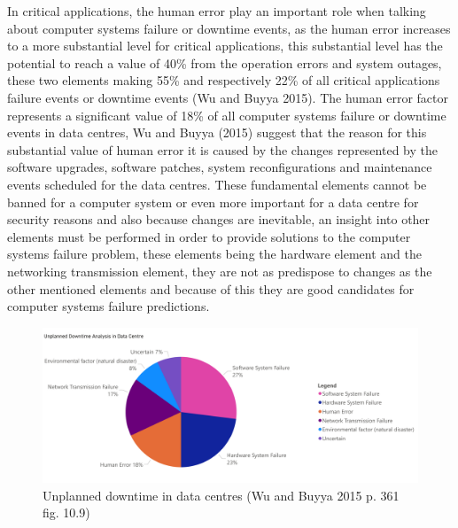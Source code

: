 In critical applications, the human error play an important role when talking about computer systems failure or
downtime events, as the human error increases to a more substantial level for critical applications, this
substantial level has the potential to reach a value of 40\% from the operation errors and system outages,
these two elements making 55\% and respectively 22\% of all critical applications failure events or downtime
events (Wu and Buyya 2015). The human error factor represents a significant value of 18\% of all computer systems
failure or downtime events in data centres, Wu and Buyya (2015) suggest that the reason for this substantial value
of human error it is caused by the changes represented by the software upgrades, software patches, system
reconfigurations and maintenance events scheduled for the data centres. These fundamental elements cannot be
banned for a computer system or even more important for a data centre for security reasons and also because
changes are inevitable, an insight into other elements must be performed in order to provide solutions to the
computer systems failure problem, these elements being the hardware element and the networking transmission element,
they are not as predispose to changes as the other mentioned elements and because of this they are good candidates
for computer systems failure predictions.

\begin{figure}[h]
    \centering
    \includegraphics[width=\textwidth]{images/unplanned-downtime.pdf}
    \captionsetup{justification=centering}
    \caption[Unplanned downtime in data centres]{Unplanned downtime in data centres
    (Wu and Buyya 2015 p. 361 fig. 10.9)}
    \label{fig:unplanned-downtime}
\end{figure}

